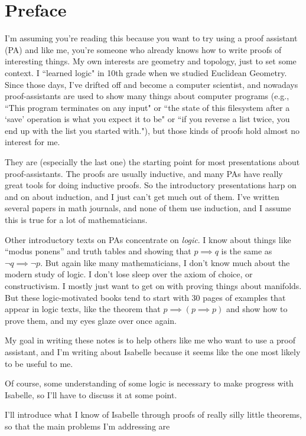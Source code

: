\chapter* {Preface}

I'm assuming you're reading this because you want to try using a proof assistant (PA) and like me, you're someone who already knows how to write proofs of interesting things. My own interests are geometry and topology, just to set some context. I ``learned logic" in 10th grade when we studied Euclidean Geometry. Since those days, I've drifted off and become a computer scientist, and nowadays proof-assistants are used to show many things about computer programs (e.g., ``This program terminates on any input" or ``the state of this filesystem after a `save' operation is what you expect it to be" or ``if you reverse a list twice, you end up with the list you started with."), but those kinds of proofs hold almost no interest for me.

They are (especially the last one) the starting point for most presentations about proof-assistants. The proofs are usually inductive, and many PAs have really great tools for doing inductive proofs. So the introductory presentations harp on and on about induction, and I just can't get much out of them. I've written several papers in math journals, and none of them use induction, and I assume this is true for a lot of mathematicians. 

Other introductory texts on PAs concentrate on \textit{logic}. I know about things like ``modus ponens'' and truth tables and showing that $p \implies q$ is the same as $\neg q \implies \neg p$. But again like many mathematicians, I don't know much about the modern study of logic. I don't lose sleep over the axiom of choice, or constructivism. I mostly just want to get on with proving things about manifolds. But these logic-motivated books tend to start with 30 pages of examples that appear in logic texts, like the theorem that $p \implies  (p \implies p)$ and show how to prove them, and my eyes glaze over once again. 

My goal in writing these notes is to help others like me who want to use a proof assistant, and I'm writing about Isabelle because it seems like the one most likely to be useful to me. 

Of course, some understanding of some logic is necessary to make progress with Isabelle, so I'll have to discuss it at some point. 

I'll introduce what I know of Isabelle through proofs of really silly little theorems, so that the main problems I'm addressing are 


